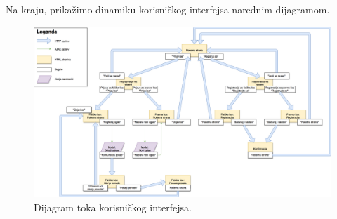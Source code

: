 \begin{mylandscape}
	Na kraju, prika\v zimo dinamiku korisni\v ckog interfejsa narednim dijagramom.
	
	\begin{figure}[H]
		\centering
		\includegraphics[width=0.7\paperwidth]{dijagrami/dijagram-toka-korisnickog-interfejsa/ki.png}
		\caption{Dijagram toka korisni\v ckog interfejsa.}
	\end{figure}
\end{mylandscape}